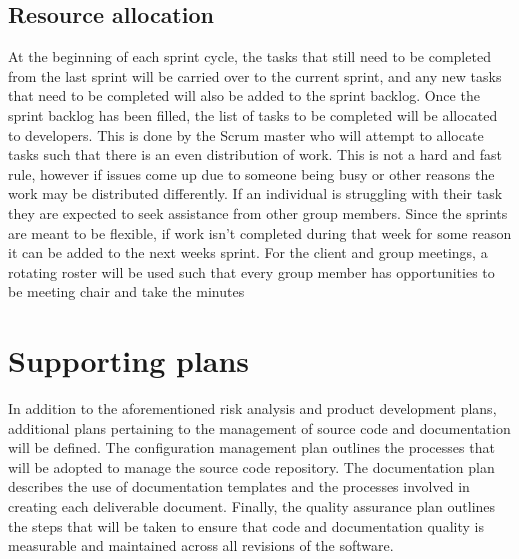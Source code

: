 \documentclass{article}
\begin{document}
\subsection{Resource allocation}
\begin{adjustwidth}{1em}{0pt}
At the beginning of each sprint cycle, the tasks that still need to be completed from the last sprint will be carried over to the current sprint, and any new tasks that need to be completed will also be added to the sprint backlog. Once the sprint backlog has been filled, the list of tasks to be completed will be allocated to developers. This is done by the Scrum master who will attempt to allocate tasks such that there is an even distribution of work. This is not a hard and fast rule, however if issues come up due to someone being busy or other reasons the work may be distributed differently. If an individual is struggling with their task they are expected to seek assistance from other group members. Since the sprints are meant to be flexible, if work isn't completed during that week for some reason it can be added to the next weeks sprint. For the client and group meetings, a rotating roster will be used such that every group member has opportunities to be meeting chair and take the minutes
\end{adjustwidth}

\section{Supporting plans}
In addition to the aforementioned risk analysis and product development plans, additional plans pertaining to the management of source code and documentation will be defined. The configuration management plan outlines the processes that will be adopted to manage the source code repository. The documentation plan describes the use of documentation templates and the processes involved in creating each deliverable document. Finally, the quality assurance plan outlines the steps that will be taken to ensure that code and documentation quality is measurable and maintained across all revisions of the software.

\end{document}
